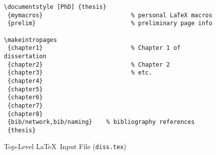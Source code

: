 \begin {figure}
{\small
\begin{verbatim}
\documentstyle [PhD] {thesis}
 {mymacros}                         % personal LaTeX macros
 {prelim}                           % preliminary page info

\makeintropages
 {chapter1}                         % Chapter 1 of dissertation
 {chapter2}                         % Chapter 2
 {chapter3}                         % etc.
 {chapter4}
 {chapter5}
 {chapter6}
 {chapter7}
 {chapter8}
 {bib/network,bib/naming}    % bibliography references
 {thesis}

\end{verbatim}
}
\caption {Top-Level \LaTeX\ Input File ({\tt diss.tex})}
\label {fig:toplevel}
\end {figure}
